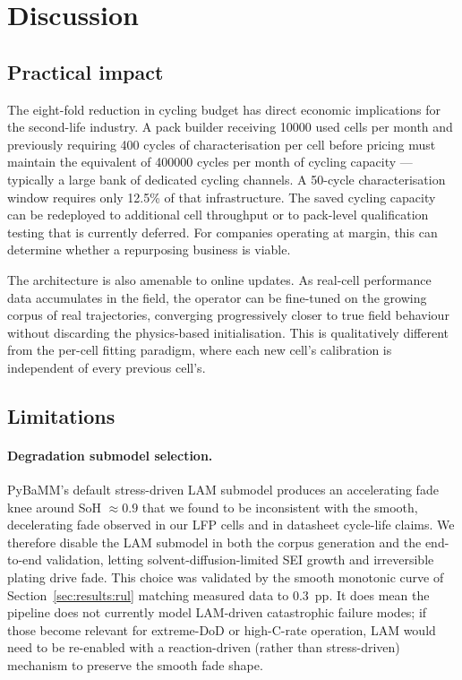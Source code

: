 \documentclass[preprint,12pt,3p,authoryear]{elsarticle}
\begin{document}
\section{Discussion}
\label{sec:discussion}

\subsection{Practical impact}

The eight-fold reduction in cycling budget has direct economic
implications for the second-life industry. A pack builder receiving
\num{10000} used cells per month and previously requiring
\num{400} cycles of characterisation per cell before pricing must
maintain the equivalent of \num{400000} cycles per month of cycling
capacity --- typically a large bank of dedicated cycling channels. A
\num{50}-cycle characterisation window requires only 12.5\% of that
infrastructure. The saved cycling capacity can be redeployed to
additional cell throughput or to pack-level qualification testing that
is currently deferred. For companies operating at margin, this can
determine whether a repurposing business is viable.

The architecture is also amenable to online updates. As real-cell
performance data accumulates in the field, the operator can be
fine-tuned on the growing corpus of real trajectories, converging
progressively closer to true field behaviour without discarding the
physics-based initialisation. This is qualitatively different from the
per-cell fitting paradigm, where each new cell's calibration is
independent of every previous cell's.

\subsection{Limitations}

\paragraph{Degradation submodel selection.} PyBaMM's default
stress-driven LAM submodel produces an accelerating fade knee around
SoH \(\approx 0.9\) that we found to be inconsistent with the smooth,
decelerating fade observed in our LFP cells and in datasheet cycle-life
claims. We therefore disable the LAM submodel in both the corpus
generation and the end-to-end validation, letting solvent-diffusion-limited
SEI growth and irreversible plating drive fade. This choice was validated
by the smooth monotonic curve of Section~\ref{sec:results:rul}
matching measured data to \SI{0.3}{pp}. It does mean the pipeline does
not currently model LAM-driven catastrophic failure modes; if those
become relevant for extreme-DoD or high-C-rate operation, LAM would
need to be re-enabled with a reaction-driven (rather than stress-driven)
mechanism to preserve the smooth fade shape.
\end{document}
